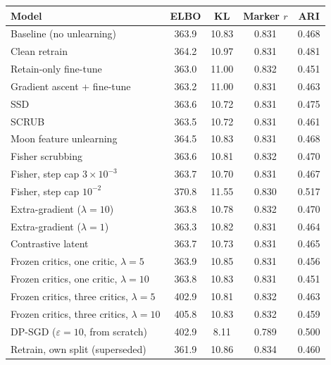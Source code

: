 \begin{tabular}{lcccc}
\toprule
Model & ELBO & KL & Marker $r$ & ARI \\
\midrule
Baseline (no unlearning) & 363.9 & 10.83 & 0.831 & 0.468 \\
Clean retrain & 364.2 & 10.97 & 0.831 & 0.481 \\
Retain-only fine-tune & 363.0 & 11.00 & 0.832 & 0.451 \\
Gradient ascent + fine-tune & 363.2 & 11.00 & 0.831 & 0.463 \\
SSD & 363.6 & 10.72 & 0.831 & 0.475 \\
SCRUB & 363.5 & 10.72 & 0.831 & 0.461 \\
Moon feature unlearning & 364.5 & 10.83 & 0.831 & 0.468 \\
Fisher scrubbing & 363.6 & 10.81 & 0.832 & 0.470 \\
Fisher, step cap $3\times 10^{-3}$ & 363.7 & 10.70 & 0.831 & 0.467 \\
Fisher, step cap $10^{-2}$ & 370.8 & 11.55 & 0.830 & 0.517 \\
Extra-gradient ($\lambda=10$) & 363.8 & 10.78 & 0.832 & 0.470 \\
Extra-gradient ($\lambda=1$) & 363.3 & 10.82 & 0.831 & 0.464 \\
Contrastive latent & 363.7 & 10.73 & 0.831 & 0.465 \\
Frozen critics, one critic, $\lambda=5$ & 363.9 & 10.85 & 0.831 & 0.456 \\
Frozen critics, one critic, $\lambda=10$ & 363.8 & 10.83 & 0.831 & 0.451 \\
Frozen critics, three critics, $\lambda=5$ & 402.9 & 10.81 & 0.832 & 0.463 \\
Frozen critics, three critics, $\lambda=10$ & 405.8 & 10.83 & 0.832 & 0.459 \\
DP-SGD ($\varepsilon=10$, from scratch) & 402.9 & 8.11 & 0.789 & 0.500 \\
Retrain, own split (superseded) & 361.9 & 10.86 & 0.834 & 0.460 \\
\bottomrule
\end{tabular}
